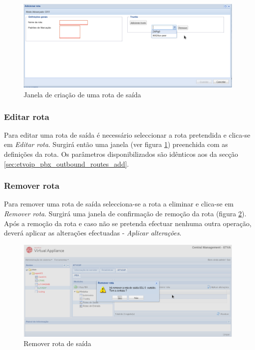 \begin{figure}[H]
        \begin{center}
        \includegraphics[scale=0.4]{screenshots/etvoip_pbx_outbound_routes_add.png}
        \caption{Janela de criação de uma rota de saída}
        \label{fig:etvoip_pbx_outbound_routes_add}
        \end{center}
\end{figure}


\subsubsection{Editar rota}

Para editar uma rota de saída é necessário seleccionar a rota pretendida e clica-se em \emph{Editar rota}. Surgirá então uma janela (ver figura \ref{fig:etvoip_pbx_outbound_routes_add}) preenchida com as definições da rota.
Os parâmetros disponibilizados são idênticos aos da secção \ref{sec:etvoip_pbx_outbound_routes_add}.

\subsubsection{Remover rota}

Para remover uma rota de saída selecciona-se a rota a eliminar e clica-se em \emph{Remover rota}.
Surgirá uma janela de confirmação de remoção da rota (figura \ref{fig:etvoip_pbx_outbound_routes_remove}). Após a remoção da rota e caso não se pretenda efectuar nenhuma outra operação, deverá aplicar as alterações efectuadas - \emph{Aplicar alterações}.

\begin{figure}[H]
        \begin{center}
        \includegraphics[scale=0.4]{screenshots/etvoip_pbx_outbound_routes_remove.png}
        \caption{Remover rota de saída}
        \label{fig:etvoip_pbx_outbound_routes_remove}
        \end{center}
\end{figure}


